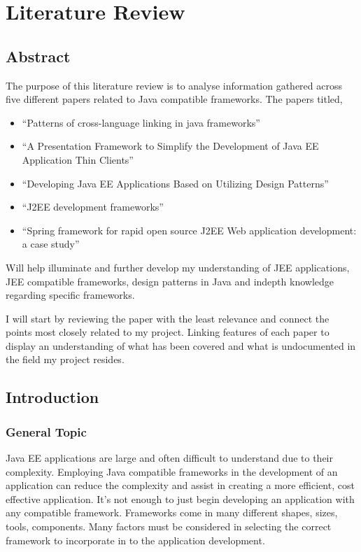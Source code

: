 \chapter*{Literature Review}
\section{Abstract}
The purpose of this literature review is to analyse information gathered across five
different papers related to Java compatible frameworks. The papers titled,
\begin{itemize}
	\item “Patterns of cross-language linking in java frameworks”\cite{patterns} 
	\item “A Presentation Framework to Simplify the Development of Java EE Application Thin Clients”\cite{thin}
	\item “Developing Java EE Applications Based on Utilizing Design Patterns”\cite{designpatterns}
	\item “J2EE development frameworks”\cite{j2ee}
	\item “Spring framework for rapid open source J2EE Web application development: a case study”\cite{spring}
	\end{itemize}
	
	Will help illuminate and further develop my understanding of JEE applications, JEE compatible frameworks, design patterns in Java and indepth knowledge regarding specific frameworks.
	
	I will start by reviewing the paper with the least relevance and connect the points most closely related to my project. Linking features of each paper to display an understanding of what has been covered and what is undocumented in the field my project resides.
	
	\section{Introduction}
	
	\subsection{General Topic}
	Java EE applications are large and often difficult to understand due to their complexity. Employing Java compatible frameworks in the development of an application can reduce the complexity and assist in creating a more efficient, cost effective application.
	It’s not enough to just begin developing an application with any compatible framework. Frameworks come in many different shapes, sizes, tools, components. Many factors must be considered in selecting the correct framework to incorporate in to the application development. 
	
